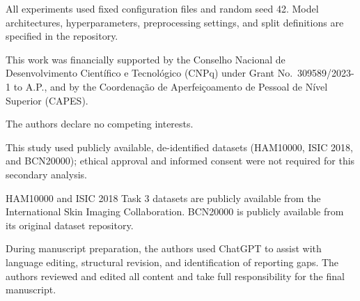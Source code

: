 \documentclass[preprint,12pt]{elsarticle}
\begin{document}

All experiments used fixed configuration files and random seed 42. Model architectures, hyperparameters, preprocessing settings, and split definitions are specified in the repository.


This work was financially supported by the Conselho Nacional de Desenvolvimento Científico e Tecnológico (CNPq) under Grant No.~309589/2023-1 to A.P., and by the Coordenação de Aperfeiçoamento de Pessoal de Nível Superior (CAPES).

The authors declare no competing interests.

This study used publicly available, de-identified datasets (HAM10000, ISIC 2018, and BCN20000); ethical approval and informed consent were not required for this secondary analysis.

HAM10000 and ISIC 2018 Task 3 datasets are publicly available from the International Skin Imaging Collaboration. BCN20000 is publicly available from its original dataset repository.

During manuscript preparation, the authors used ChatGPT to assist with language editing, structural revision, and identification of reporting gaps. The authors reviewed and edited all content and take full responsibility for the final manuscript.



\end{document}
